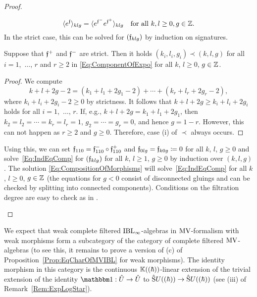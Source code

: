 \documentclass[\MainFolder/Text.tex]{subfiles}
\begin{document}
\begin{proof}
\begin{ProofList}
\begin{equation}\label{Eq:IndEqComp}
 \langle e^{\mathfrak{f}} \rangle_{klg} = \langle e^{\mathfrak{f}^-}e^{\mathfrak{f}^+}\rangle_{klg}\quad\text{for all }k, l\ge 0, g\in\mathbb{Z}.
\end{equation}
In the strict case, this can be solved for $(\mathfrak{f}_{klg})$ by induction on signatures.
\begin{SubClaim}
Suppose that $\mathfrak{f}^+$ and $\mathfrak{f}^-$ are strict. Then it holds $(k_i,l_i,g_i)\prec (k,l,g)$ for all $i=1$,~$\dotsc$, $r$ and $r\ge 2$ in \eqref{Eq:ComponentOfExpo} for all $k$, $l\ge 0$, $g\in\mathbb{Z}$.
\end{SubClaim}
\begin{proof}
We compute
$$ k + l + 2g - 2 = (k_1 + l_1 + 2 g_1 -2) + \dotsb + (k_r + l_r + 2 g_r -2), $$
where $k_i + l_i + 2g_i - 2 \ge 0$ by strictness. It follows that $k+l+2g \ge k_i + l_i + 2 g_i$ holds for all $i=1$,~$\dotsc$, $r$. If, e.g., $k + l + 2g = k_1 + l_1 + 2 g_1$, then $k_2 = l_2 = \dotsb = k_r = l_r = 1$, $g_2 = \dotsb = g_r = 0$, and hence $g = 1-r$. However, this can not happen as $r\ge 2$ and $g\ge 0$. Therefore, case (i) of $\prec$ always occurs.
\renewcommand{\qed}{\hfill\textit{(Subclaim) }$\square$}
\end{proof}
Using this, we can set $\mathfrak{f}_{110} = \mathfrak{f}^-_{110}\circ\mathfrak{f}^+_{110}$ and $\mathfrak{f}_{0lg}=\mathfrak{f}_{k0g}\coloneqq 0$ for all $k$, $l$, $g\ge 0$ and solve~\eqref{Eq:IndEqComp} for $(\mathfrak{f}_{klg})$ for all $k$, $l\ge 1$, $g\ge 0$ by induction over $(k,l,g)$. The solution \eqref{Eq:CompositionOfMorphisms} will solve~\eqref{Eq:IndEqComp} for all $k$, $l\ge 0$, $g\in \mathbb{Z}$ (the equations for $g<0$ consist of disconnected gluings and can be checked by splitting into connected components). Conditions on the filtration degree are easy to check as in \cite[Lemma~8.5]{Cieliebak2015}.
\qedhere
\end{ProofList}
\end{proof}

We expect that weak complete filtered $\mathrm{IBL}_\infty$-algebras in $\mathrm{MV}$-formalism with weak morphisms form a subcategory of the category of complete filtered $\mathrm{MV}$-algebras (to see this, it remains to prove a version of (c) of Proposition~\ref{Prop:EqCharOfMVIBL} for weak morphisms). The identity morphism in this category is the continuous $\mathbb{K}((\hbar))$-linear extension of the trivial extension of the identity $\Id: \hat{U} \rightarrow \hat{U}$ to $\hat{\mathrm{S}}U((\hbar))\rightarrow\hat{\mathrm{S}}U((\hbar))$ (see (iii) of Remark~\ref{Rem:ExpLogStar}).
\end{document}
